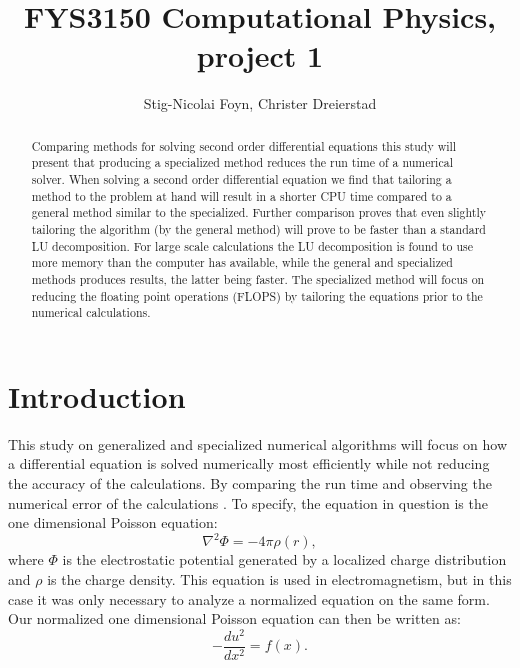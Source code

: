 \documentclass{emulateapj}
\begin{document}
\title{FYS3150 Computational Physics, project 1}

\author{Stig-Nicolai Foyn, Christer Dreierstad}





\begin{abstract}
Comparing methods for solving second order differential equations this study will present that producing a specialized method reduces the run time of a numerical solver. When solving a second order differential equation we find that tailoring a method to the problem at hand will result in a shorter CPU time compared to a general method similar to the specialized. Further comparison proves that even slightly tailoring the algorithm (by the general method) will prove to be faster than a standard LU decomposition. For large scale calculations the LU decomposition is found to use more memory than the computer has available, while the general and specialized methods produces results, the latter being faster. The specialized method will focus on reducing the floating point operations (FLOPS) by tailoring the equations prior to the numerical calculations. 

\end{abstract}

\section{Introduction}
\label{sec:introduction}
This study on generalized and specialized numerical algorithms will focus on how a differential equation is solved numerically most efficiently while not reducing the accuracy of the calculations. By comparing the run time and observing the numerical error of the calculations . To specify, the equation in question is the one dimensional Poisson equation:
%
\begin{equation*}
    {\nabla^{2}} \Phi = -4\pi \rho(r),
\end{equation*}
%
where $\Phi$ is the electrostatic potential generated by a localized charge distribution and $\rho$ is the charge density. This equation is used in electromagnetism, but in this case it was only necessary to analyze a normalized equation on the same form. Our normalized one dimensional Poisson equation can then be written as:
%
\begin{equation}\label{eq:-u''}
    -\frac{du^2}{dx^2} = f(x).
\end{equation}
\end{document}
